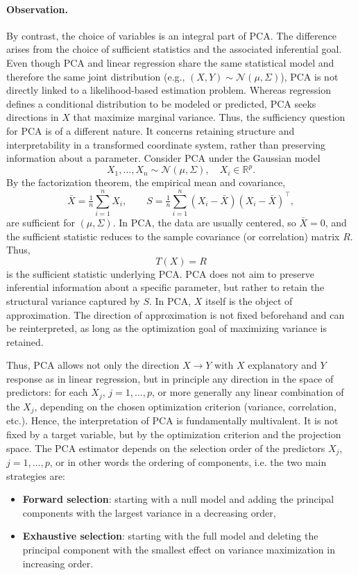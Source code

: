\paragraph{Observation.}
By contrast, the choice of variables is an integral part of PCA. The difference arises from the choice of sufficient statistics and the associated inferential goal. Even though PCA and linear regression share the same statistical model and therefore the same joint distribution (e.g., $(X,Y) \sim \mathcal{N}(\mu, \Sigma)$), PCA is not directly linked to a likelihood-based estimation problem. Whereas regression defines a conditional distribution to be modeled or predicted, PCA seeks directions in $X$ that maximize marginal variance. Thus, the sufficiency question for PCA is of a different nature. It concerns retaining structure and interpretability in a transformed coordinate system, rather than preserving information about a parameter. Consider PCA under the Gaussian model
\[
X_1,\dots,X_n \sim \mathcal{N}(\mu, \Sigma), \quad X_i \in \mathbb{R}^p.
\]
By the factorization theorem, the empirical mean and covariance,
\[
\bar{X} = \tfrac{1}{n} \sum_{i=1}^n X_i,
\qquad
S = \tfrac{1}{n}\sum_{i=1}^n (X_i - \bar{X})(X_i - \bar{X})^\top,
\]
are sufficient for $(\mu,\Sigma)$. In PCA, the data are usually centered, so $\bar{X} = 0$, and the sufficient statistic reduces to the sample covariance (or correlation) matrix $R$. Thus,
\[
T(X) = R
\]
is the sufficient statistic underlying PCA. PCA does not aim to preserve inferential information about a specific parameter, but rather to retain the structural variance captured by $S$. In PCA, $X$ itself is the object of approximation. The direction of approximation is not fixed beforehand and can be reinterpreted, as long as the optimization goal of maximizing variance is retained. 

Thus, PCA allows not only the direction $X \to Y$ with $X$ explanatory and $Y$ response as in linear regression, but in principle any direction in the space of predictors: for each $X_j$, $j=1,\dots,p$, or more generally any linear combination of the $X_j$, depending on the chosen optimization criterion (variance, correlation, etc.). Hence, the interpretation of PCA is fundamentally multivalent. It is not fixed by a target variable, but by the optimization criterion and the projection space. The PCA estimator depends on the selection order of the predictors $X_j$, $j = 1, \dots, p$, or in other words the ordering of components, i.e. the two main strategies are:

\begin{itemize}
    \item \textbf{Forward selection}: starting with a null model and adding the principal components with the largest variance in a decreasing order,
    \item \textbf{Exhaustive selection}: starting with the full model and deleting the principal component with the smallest effect on variance maximization in increasing order.
\end{itemize}

